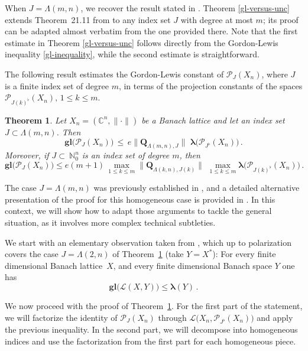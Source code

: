 \documentclass[12pt]{amsart}
\numberwithin{subsection}{section}
\newtheorem{theorem}{Theorem}[section]
\theoremstyle{definition}
\theoremstyle{remark}
\begin{document}
When $J = \Lambda(m,n)$, we recover the result stated in \cite[Proposition3.1]{defant2011bohr}. Theorem \ref{gl-versus-unc}
extends Theorem~21.11 from \cite{defant2019libro} to any index set $J$ with degree at most $m$; its proof can be adapted almost
verbatim from the one provided there. Note that the first estimate in Theorem \ref{gl-versus-unc} follows directly from the
Gordon-Lewis inequality \eqref{gl-inequality}, while the second estimate is straightforward.

\bigskip
The following result estimates the Gordon-Lewis constant of $\mathcal{P}_{J}(X_n)$, where $J$ is a finite  index set of degree
$m$, in terms of  the projection constants of the spaces $\mathcal{P}_{J(k)^\flat}(X_n),\, 1 \leq  k \leq m$.

\begin{theorem} \label{gl_versus_proj}
Let $X_n = (\mathbb{C}^n,\|\cdot\|)$  be a Banach  lattice and  let an index set $J \subset \Lambda(m,n)$. Then
\[
\boldsymbol{g\!l}\big( \mathcal{P}_{J}(X_n)\big) \,\le \,e  \|\mathbf{Q}_{\Lambda(m,n),J}\|\,\,
\boldsymbol{\lambda}\big( \mathcal{P}_{J^\flat}(X_n)\big)\,.
\]
Moreover, if $J\subset~\mathbb{N}_0^n$ is an index set of degree  $m$, then
\[
\boldsymbol{g\!l}\big( \mathcal{P}_{J}(X_n)\big) \le e (m+1) \,\max_{1 \leq  k \leq m}\|\mathbf{Q}_{\Lambda(k,n),J(k)}\|\,\,
\max_{1 \leq  k \leq m} \boldsymbol{\lambda}\big( \mathcal{P}_{J(k)^\flat}(X_n)\big)\,.
\]
\end{theorem}



The case $J= \Lambda(m,n)$ was previously established in \cite[Proposition 4.2]{defant2011bohr}, and a detailed alternative
presentation of the proof for this homogeneous case is provided in \cite[Proposition 22.1]{defant2019libro}. In this context,
we will show how to adapt those arguments to tackle the general situation, as it involves more complex technical subtleties.


We start with an  elementary  observation  taken from \cite[Lemma 22.2]{defant2019libro}, which up to polarization covers the
case $J=\Lambda(2,n)$ of Theorem~\ref{gl_versus_proj} (take $Y= X^\ast$): For every finite dimensional Banach lattice~$X$,
and every finite dimensional Banach space $Y$ one has
\begin{equation}\label{supo}
\boldsymbol{g\!l}\big( \mathcal{L}(X,Y)\big) \leq \boldsymbol{\lambda}(Y)\,.
\end{equation}

We now proceed with the proof of Theorem~\ref{gl_versus_proj}. For the first part of the statement, we will factorize the identity of $\mathcal{P}_{J}(X_n)$ through $\mathcal{L}\big(X_n, \mathcal{P}_{J^\flat}(X_n)\big)$ and apply the previous inequality. In the second part, we will decompose into homogeneous indices and use the factorization from the first part for each homogeneous piece.
\end{document}
